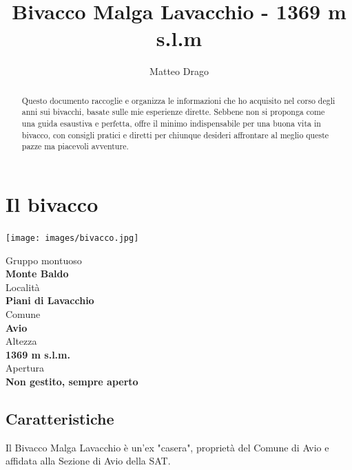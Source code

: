 \documentclass{article}
\title{\textbf{Bivacco Malga Lavacchio - 1369 m s.l.m}}
\author{Matteo Drago}
\begin{document}
\maketitle
\thispagestyle{fancy} %

\begin{abstract}
Questo documento raccoglie e organizza le informazioni che ho acquisito nel corso degli anni sui bivacchi, basate sulle mie esperienze dirette. Sebbene non si proponga come una guida esaustiva e perfetta, offre il minimo indispensabile per una buona vita in bivacco, con consigli pratici e diretti per chiunque desideri affrontare al meglio queste pazze ma piacevoli avventure.
\end{abstract}

\section{Il bivacco}

\noindent
\begin{minipage}[t]{0.45\textwidth}
  \vspace{0pt} %
  \texttt{[image: images/bivacco.jpg]}
\end{minipage}%
\hfill
\begin{minipage}[t]{0.5\textwidth}
  \vspace{0pt} %
  
  Gruppo montuoso\\
  \textbf{\large Monte Baldo}
  \\[1em] %
  Località\\
  \textbf{\large Piani di Lavacchio}
  \\[1em] %
  Comune\\  
  \textbf{\large Avio}
  \\[1em] %
  Altezza\\  
  \textbf{\large 1369 m s.l.m.}
  \\[1em] %
  Apertura\\  
  \textbf{\large Non gestito, sempre aperto}

\end{minipage}

\subsection{Caratteristiche}
Il Bivacco Malga Lavacchio è un'ex "casera", proprietà del Comune di Avio e affidata alla Sezione di Avio della SAT.
\end{document}
